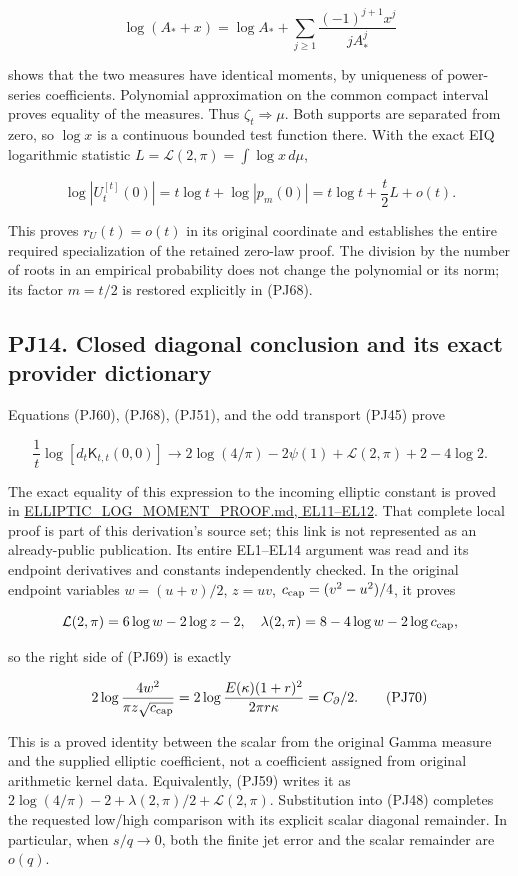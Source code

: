 \documentclass[10pt]{article}
\begin{document}
\[
\log(A_*+x)=\log A_*+
\sum_{j\ge1}\frac{(-1)^{j+1}x^j}{jA_*^j}
\]

shows that the two measures have identical moments, by uniqueness of power-series coefficients. Polynomial approximation on the common compact interval proves equality of the measures. Thus \(\zeta_t\Rightarrow\mu\). Both supports are separated from zero, so \(\log x\) is a continuous bounded test function there. With the exact EIQ logarithmic statistic \(L=\mathcal L(2,\pi)=\int\log x\,d\mu\),

\[
\log|U_t^{[t]}(0)|
=t\log t+\log|p_m(0)|
=t\log t+\frac t2L+o(t).
\tag{PJ68}
\]

This proves \(r_U(t)=o(t)\) in its original coordinate and establishes the entire required specialization of the retained zero-law proof. The division by the number of roots in an empirical probability does not change the polynomial or its norm; its factor \(m=t/2\) is restored explicitly in (PJ68).

\subsection{PJ14. Closed diagonal conclusion and its exact provider dictionary}\label{pj14.-closed-diagonal-conclusion-and-its-exact-provider-dictionary}

Equations (PJ60), (PJ68), (PJ51), and the odd transport (PJ45) prove

\[
\frac1t\log[d_t\mathsf K_{t,t}(0,0)]
\longrightarrow 2\log(4/\pi)-2\psi(1)+\mathcal L(2,\pi)+2-4\log2.
\tag{PJ69}
\]

The exact equality of this expression to the incoming elliptic constant is proved in \href{ELLIPTIC_LOG_MOMENT_PROOF.md}{ELLIPTIC\_LOG\_MOMENT\_PROOF.md, EL11--EL12}. That complete local proof is part of this derivation's source set; this link is not represented as an already-public publication. Its entire EL1--EL14 argument was read and its endpoint derivatives and constants independently checked. In the original endpoint variables \(w=(u+v)/2\), \(z=uv\), \(c_{\rm cap}=(v^2-u^2)/4\), it proves

\[
\mathcal L(2,\pi)=6\log w-2\log z-2,
\quad\lambda(2,\pi)=8-4\log w-2\log c_{\rm cap},
\]

so the right side of (PJ69) is exactly

\[
2\log\frac{4w^2}{\pi z\sqrt{c_{\rm cap}}}
=2\log\frac{E(\kappa)(1+r)^2}{2\pi r\kappa}
=C_\partial/2.
\tag{PJ70}
\]

This is a proved identity between the scalar from the original Gamma measure and the supplied elliptic coefficient, not a coefficient assigned from original arithmetic kernel data. Equivalently, (PJ59) writes it as \(2\log(4/\pi)-2+\lambda(2,\pi)/2+\mathcal L(2,\pi)\). Substitution into (PJ48) completes the requested low/high comparison with its explicit scalar diagonal remainder. In particular, when \(s/q\to0\), both the finite jet error and the scalar remainder are \(o(q)\).
\end{document}
